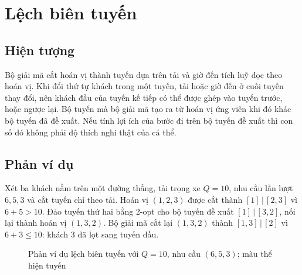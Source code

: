 \section{Lệch biên tuyến}
\label{sec:drift}

\subsection{Hiện tượng}

Bộ giải mã cắt hoán vị thành tuyến dựa trên tải và giờ đến tích luỹ dọc theo hoán vị. Khi đổi thứ tự
khách trong một tuyến, tải hoặc giờ đến ở cuối tuyến thay đổi, nên khách đầu của tuyến kế tiếp có thể
được ghép vào tuyến trước, hoặc ngược lại. Bộ tuyến mà bộ giải mã tạo ra từ hoán vị ứng viên khi đó khác
bộ tuyến đã đề xuất. Nếu tính lợi ích của bước đi trên bộ tuyến đề xuất thì con số đó không phải độ thích
nghi thật của cá thể.

\subsection{Phản ví dụ}

Xét ba khách nằm trên một đường thẳng, tải trọng xe $Q = 10$, nhu cầu lần lượt $6, 5, 3$ và cắt tuyến
chỉ theo tải. Hoán vị $(1,2,3)$ được cắt thành $[1] \,|\, [2,3]$ vì $6 + 5 > 10$. Đảo tuyến thứ hai bằng
2-opt cho bộ tuyến đề xuất $[1] \,|\, [3,2]$, nối lại thành hoán vị $(1,3,2)$. Bộ giải mã cắt lại
$(1,3,2)$ thành $[1,3] \,|\, [2]$ vì $6 + 3 \le 10$: khách 3 đã lọt sang tuyến đầu.

\begin{figure}[H]
\centering
{}
\caption{Phản ví dụ lệch biên tuyến với $Q = 10$, nhu cầu $(6,5,3)$; màu thể hiện tuyến}
\label{fig:drift}
\end{figure}

